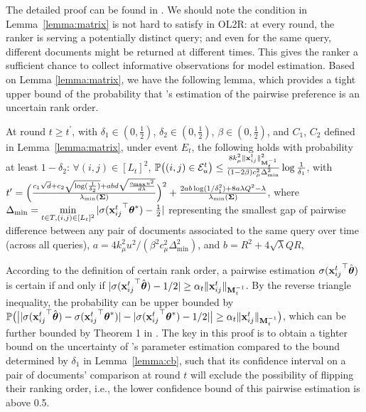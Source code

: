 The detailed proof can be found in \cite{vershynin2010introduction}. We should note the condition in Lemma~\ref{lemma:matrix} is not hard to satisfy in OL2R: at every round, the ranker is serving a potentially distinct query; and even for the same query, different documents might be returned at different times. This gives the ranker a sufficient chance to collect informative observations for model estimation.  Based on Lemma \ref{lemma:matrix}, we have the following lemma, which provides a tight upper bound of the probability that \model{}'s estimation of the pairwise preference is an uncertain rank order.

\begin{lemma}
At round $t \geq t^\prime$, with $\delta_1 \in (0, \frac{1}{2})$, $\delta_2 \in (0, \frac{1}{2})$, $\beta \in (0, \frac{1}{2})$, and $C_1$, $C_2$ defined in Lemma~\ref{lemma:matrix}, under event $E_t$, the following holds with probability at least $1 - \delta_2$: $\forall (i, j) \in [L_t]^2$, $\mathbb{P}\big((i, j) \in \mathcal{E}_u^t\big) \leq \frac{8k_{\mu}^2\Vert{\mathbf{x}_{ij}^t}\Vert_{\mathbf{M}_t^{-1}}^2}{(1 - 2\beta) c_{\mu}^2\Delta_{\min}^2}\log{\frac{1}{\delta_1}}$, with 
$t^\prime = \Big(\frac{c_1\sqrt{d} + c_2\sqrt{\log(\frac{1}{\delta_2})} + abd\sqrt{\frac{o_{\text{max}}u^2}{d\lambda}}}{\lambda_{\text{min}}(\mathbf{\Sigma})}\Big)^2 + \frac{2ab\log({1}/{\delta_1^2}) + 8a\lambda Q^2 - \lambda}{\lambda_{\text{min}}(\mathbf{\Sigma})}$, 
where $\Delta_{\min} = \min\limits_{t\in T, (i, j) \in [L_t]^2}| \sigma({{\mathbf{x}_{ij}^t}}^\top\boldsymbol{\theta}^*) - \frac{1}{2}|$ representing the smallest gap of pairwise difference between any pair of documents associated to the same query over time (across all queries), $a = {4k_{\mu}^2 u^2}/({\beta^2c_{\mu}^2\Delta_{\text{min}}^2})$, and $b = R^2 + 4\sqrt{\lambda}QR$, 
\label{lemma:uncertain}
\end{lemma}


\begin{hproof}
According to the definition of certain rank order, a pairwise estimation $\sigma({\mathbf{x}_{ij}^t}^\top\hat{\boldsymbol{\theta}})$ is certain if and only if $|\sigma({\mathbf{x}_{ij}^t}^\top\hat{\boldsymbol{\theta}}) - 1/2| \geq \alpha_t\Vert {\mathbf{x}_{ij}^t}\Vert_{\mathbf{M}_{t}^{-1}}$. By the reverse triangle inequality, the probability can be upper bounded by $\mathbb{P}\big(\big| |\sigma({\mathbf{x}_{ij}^t}^\top\hat{\boldsymbol{\theta}}) - \sigma({\mathbf{x}_{ij}^t}^\top\boldsymbol{\theta}^*)| - |\sigma({\mathbf{x}_{ij}^t}^\top\boldsymbol{\theta}^*) - 1/2|\big| \geq \alpha_t\Vert {\mathbf{x}_{ij}^t}\Vert_{\mathbf{M}_{t}^{-1}}\big)$, which can be further bounded by Theorem 1 in \cite{abbasi2011improved}. The key in this proof is to obtain a tighter bound on the uncertainty of \model{}'s parameter estimation compared to the bound determined by $\delta_1$ in Lemma~\ref{lemma:cb}, such that its confidence interval on a pair of documents' comparison at round $t$ will exclude the possibility of flipping their ranking order, i.e., the lower confidence bound of this pairwise estimation is above 0.5.
\end{hproof}

